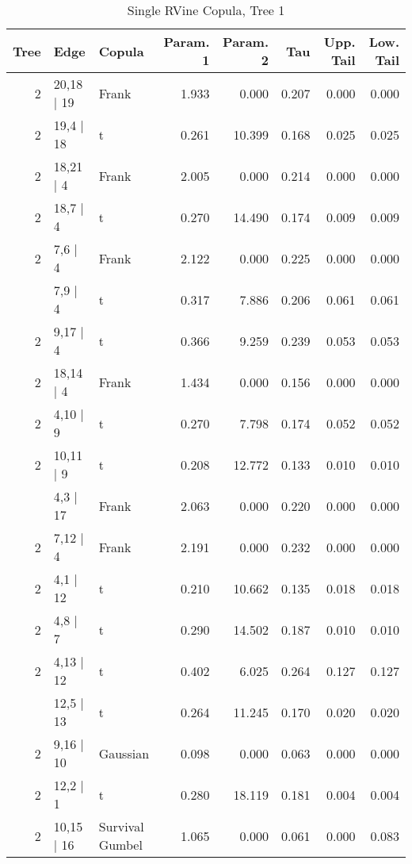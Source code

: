 \begin{table}

\caption{Single RVine Copula, Tree 1}
\centering
\begin{tabular}[t]{rllrrrrr}
\toprule
Tree & Edge & Copula & Param. 1 & Param. 2 & Tau & Upp. Tail & Low. Tail\\
\midrule
2 & 20,18 | 19 & Frank & 1.933 & 0.000 & 0.207 & 0.000 & 0.000\\
2 & 19,4 | 18 & t & 0.261 & 10.399 & 0.168 & 0.025 & 0.025\\
2 & 18,21 | 4 & Frank & 2.005 & 0.000 & 0.214 & 0.000 & 0.000\\
2 & 18,7 | 4 & t & 0.270 & 14.490 & 0.174 & 0.009 & 0.009\\
2 & 7,6 | 4 & Frank & 2.122 & 0.000 & 0.225 & 0.000 & 0.000\\
\addlinespace
2 & 7,9 | 4 & t & 0.317 & 7.886 & 0.206 & 0.061 & 0.061\\
2 & 9,17 | 4 & t & 0.366 & 9.259 & 0.239 & 0.053 & 0.053\\
2 & 18,14 | 4 & Frank & 1.434 & 0.000 & 0.156 & 0.000 & 0.000\\
2 & 4,10 | 9 & t & 0.270 & 7.798 & 0.174 & 0.052 & 0.052\\
2 & 10,11 | 9 & t & 0.208 & 12.772 & 0.133 & 0.010 & 0.010\\
\addlinespace
2 & 4,3 | 17 & Frank & 2.063 & 0.000 & 0.220 & 0.000 & 0.000\\
2 & 7,12 | 4 & Frank & 2.191 & 0.000 & 0.232 & 0.000 & 0.000\\
2 & 4,1 | 12 & t & 0.210 & 10.662 & 0.135 & 0.018 & 0.018\\
2 & 4,8 | 7 & t & 0.290 & 14.502 & 0.187 & 0.010 & 0.010\\
2 & 4,13 | 12 & t & 0.402 & 6.025 & 0.264 & 0.127 & 0.127\\
\addlinespace
2 & 12,5 | 13 & t & 0.264 & 11.245 & 0.170 & 0.020 & 0.020\\
2 & 9,16 | 10 & Gaussian & 0.098 & 0.000 & 0.063 & 0.000 & 0.000\\
2 & 12,2 | 1 & t & 0.280 & 18.119 & 0.181 & 0.004 & 0.004\\
2 & 10,15 | 16 & Survival Gumbel & 1.065 & 0.000 & 0.061 & 0.000 & 0.083\\
\bottomrule
\end{tabular}
\end{table}
